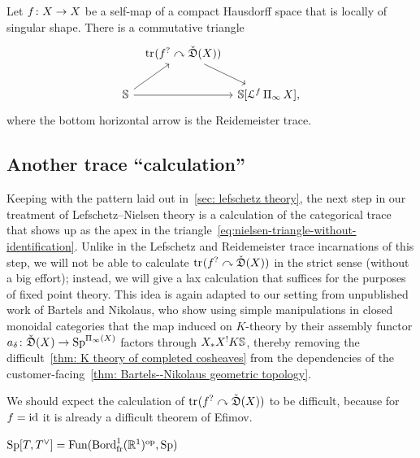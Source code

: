 \begin{cor}
  Let $f\colon X\to X$ be a self-map of a compact Hausdorff space that is locally of singular shape. There is a commutative triangle
  \begin{equation}
    \label{eq:nielsen-triangle-without-identification}
    \begin{tikzcd}[column sep=tiny]
      & \tr{f^?\curvearrowright\coShat (\tset )}{}\arrow[dr] \\
      \SS\arrow[rr]\arrow[ru] && \SS\lbrack\cL^{f}\fundgroupoid\tset\rbrack,
    \end{tikzcd}
  \end{equation}
  where the bottom horizontal arrow is the Reidemeister trace.
\end{cor}
\subsection{Another trace ``calculation''}
Keeping with the pattern laid out in~\cref{sec: lefschetz theory}, the next step in our treatment of Lefschetz--Nielsen theory is a calculation of the categorical trace that shows up as the apex in the triangle~\eqref{eq:nielsen-triangle-without-identification}. Unlike in the Lefschetz and Reidemeister trace incarnations of this step, we will not be able to calculate $\mathrm{tr}_{} (f^?\curvearrowright\check{\mathfrak{D}} (X ))$ in the strict sense (without a big effort); instead, we will give a lax calculation that suffices for the purposes of fixed point theory. This idea is again adapted to our setting from unpublished work of Bartels and Nikolaus, who show using simple manipulations in closed monoidal categories that the map induced on $K$-theory by their assembly functor $a_\delta\colon\check{\mathfrak{D}} (X )\to \operatorname{Sp}^{\operatorname{\Pi_\infty} (X )}$ factors through $X_*X^!K\mathbb{S}$, thereby removing the difficult~\cref{thm: K theory of completed cosheaves} from the dependencies of the customer-facing~\cref{thm: Bartels--Nikolaus geometric topology}.

We should expect the calculation of $\mathrm{tr}_{} (f^?\curvearrowright\check{\mathfrak{D}} (X ))$ to be difficult, because for $f=\operatorname{id}$ it is already a difficult theorem of Efimov.
\begin{defn}
  $\operatorname{Sp}\lbrack T,T^\vee\rbrack = \operatorname{Fun} (\mathrm{Bord}^1_{\mathrm{fr}}(\mathbb{R}^1)^{{\mathrm{op}}},\operatorname{Sp} )$
\end{defn}

